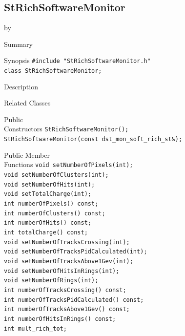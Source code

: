 \documentclass[twoside]{article}
\newcommand{\entrylabel}[1]{\mbox{\textbf{{#1}}}\hfil}%
\newenvironment{entry}
{\begin{list}{}%
    {\renewcommand{\makelabel}{\entrylabel}%
     \setlength{\labelwidth}{90pt}%
     \setlength{\leftmargin}{\labelwidth}
     \advance\leftmargin by \labelsep%
      }%
    }%
  {\end{list}}
\newcommand{\Entrylabel}[1]%
{\raisebox{0pt}[1ex][0pt]{\makebox[\labelwidth][l]%
    {\parbox[t]{\labelwidth}{\hspace{0pt}\textbf{{#1}}}}}}
\newenvironment{Entry}%
{\renewcommand{\entrylabel}{\Entrylabel}\begin{entry}}%
  {\end{entry}}
\begin{document}
\subsection{StRichSoftwareMonitor}
\label{sec:StRichSoftwareMonitor}
\begin{Entry}
\item[Summary]
\item[Synopsis]
    \verb+#include "StRichSoftwareMonitor.h"+\\
    \verb+class StRichSoftwareMonitor;+\\
\item[Description]
\item[Related Classes]
\item[Public\\ Constructors]
    \verb+StRichSoftwareMonitor();+\\
    \verb+StRichSoftwareMonitor(const dst_mon_soft_rich_st&);+\\
\item[Public Member\\ Functions]
    \verb+void setNumberOfPixels(int);+\\
    \verb+void setNumberOfClusters(int);+\\
    \verb+void setNumberOfHits(int);+\\
    \verb+void setTotalCharge(int);+\\
    \verb+int numberOfPixels() const;+\\
    \verb+int numberOfClusters() const;+\\
    \verb+int numberOfHits() const;+\\
    \verb+int totalCharge() const;+\\
    \verb+void setNumberOfTracksCrossing(int);+\\
    \verb+void setNumberOfTracksPidCalculated(int);+\\
    \verb+void setNumberOfTracksAbove1Gev(int);+\\
    \verb+void setNumberOfHitsInRings(int);+\\
    \verb+void setNumberOfRings(int);+\\
    \verb+int numberOfTracksCrossing() const;+\\
    \verb+int numberOfTracksPidCalculated() const;+\\
    \verb+int numberOfTracksAbove1Gev() const;+\\
    \verb+int numberOfHitsInRings() const;+\\
    \verb+int mult_rich_tot;+\\
\end{Entry}
\clearpage
\end{document}
